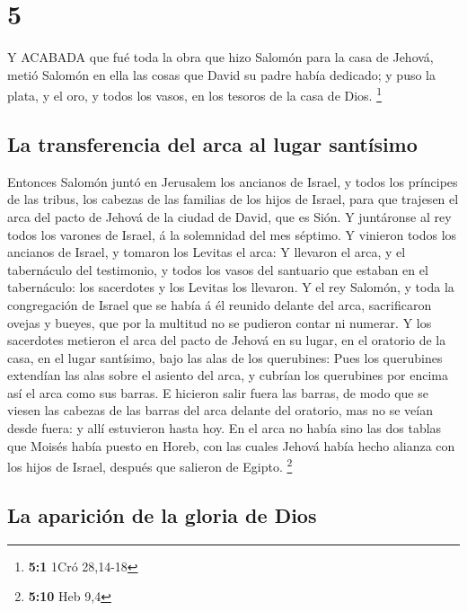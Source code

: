 \hypertarget{section-4}{%
\section{5}\label{section-4}}

 Y ACABADA que fué toda la obra que hizo Salomón para la
casa de Jehová, metió Salomón en ella las cosas que David su padre había
dedicado; y puso la plata, y el oro, y todos los vasos, en los tesoros
de la casa de Dios. \footnote{\textbf{5:1} 1Cró 28,14-18}

\hypertarget{la-transferencia-del-arca-al-lugar-santuxedsimo}{%
\subsection{La transferencia del arca al lugar
santísimo}\label{la-transferencia-del-arca-al-lugar-santuxedsimo}}

 Entonces Salomón juntó en Jerusalem los ancianos de Israel,
y todos los príncipes de las tribus, los cabezas de las familias de los
hijos de Israel, para que trajesen el arca del pacto de Jehová de la
ciudad de David, que es Sión.  Y juntáronse al rey todos los
varones de Israel, á la solemnidad del mes séptimo.  Y
vinieron todos los ancianos de Israel, y tomaron los Levitas el arca:
 Y llevaron el arca, y el tabernáculo del testimonio, y
todos los vasos del santuario que estaban en el tabernáculo: los
sacerdotes y los Levitas los llevaron.  Y el rey Salomón, y
toda la congregación de Israel que se había á él reunido delante del
arca, sacrificaron ovejas y bueyes, que por la multitud no se pudieron
contar ni numerar.  Y los sacerdotes metieron el arca del
pacto de Jehová en su lugar, en el oratorio de la casa, en el lugar
santísimo, bajo las alas de los querubines:  Pues los
querubines extendían las alas sobre el asiento del arca, y cubrían los
querubines por encima así el arca como sus barras.  E
hicieron salir fuera las barras, de modo que se viesen las cabezas de
las barras del arca delante del oratorio, mas no se veían desde fuera: y
allí estuvieron hasta hoy.  En el arca no había sino las
dos tablas que Moisés había puesto en Horeb, con las cuales Jehová había
hecho alianza con los hijos de Israel, después que salieron de Egipto.
\footnote{\textbf{5:10} Heb 9,4}

\hypertarget{la-apariciuxf3n-de-la-gloria-de-dios}{%
\subsection{La aparición de la gloria de
Dios}\label{la-apariciuxf3n-de-la-gloria-de-dios}}

